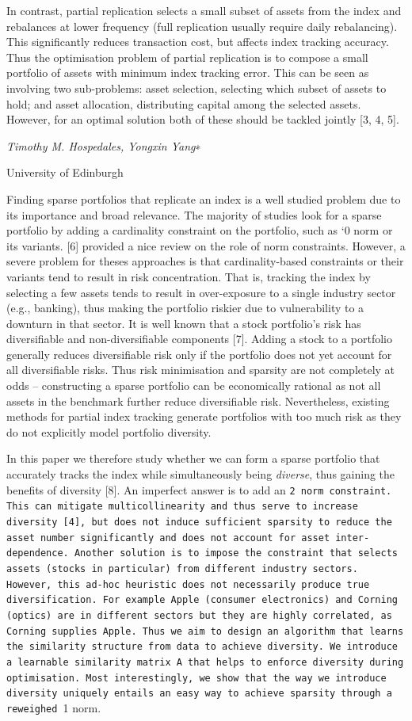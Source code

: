 \documentclass{article}
\begin{document}
In contrast, partial replication selects a small subset of assets from the index and rebalances at lower frequency (full replication usually require daily rebalancing). This significantly reduces transaction cost, but affects index tracking accuracy. Thus the optimisation problem of partial replication is to compose a small portfolio of assets with minimum index tracking error. This can be seen as involving two sub-problems: asset selection, selecting which subset of assets to hold; and asset allocation, distributing capital among the selected assets. However, for an optimal solution both of these should be tackled jointly [3, 4, 5].

\textit{Timothy M. Hospedales, Yongxin Yang}∗

University of Edinburgh

Finding sparse portfolios that replicate an index is a well studied problem due to its importance and broad relevance. The majority of studies look for a sparse portfolio by adding a cardinality constraint on the portfolio, such as `0 norm or its variants. [6] provided a nice review on the role of norm constraints. However, a severe problem for theses approaches is that cardinality-based constraints or their variants tend to result in risk concentration. That is, tracking the index by selecting a few assets tends to result in over-exposure to a single industry sector (e.g., banking), thus making the portfolio riskier due to vulnerability to a downturn in that sector. It is well known that a stock portfolio's risk has diversifiable and non-diversifiable components [7]. Adding a stock to a portfolio generally reduces diversifiable risk only if the portfolio does not yet account for all diversifiable risks. Thus risk minimisation and sparsity are not completely at odds – constructing a sparse portfolio can be economically rational as not all assets in the benchmark further reduce diversifiable risk. Nevertheless, existing methods for partial index tracking generate portfolios with too much risk as they do not explicitly model portfolio diversity.

In this paper we therefore study whether we can form a sparse portfolio that accurately tracks the index while simultaneously being \textit{diverse}, thus gaining the benefits of diversity [8]. An imperfect answer is to add an \verb|2 norm constraint. This can mitigate multicollinearity and thus serve to increase diversity [4], but does not induce sufficient sparsity to reduce the asset number significantly and does not account for asset inter-dependence. Another solution is to impose the constraint that selects assets (stocks in particular) from different industry sectors. However, this ad-hoc heuristic does not necessarily produce true diversification. For example Apple (consumer electronics) and Corning (optics) are in different sectors but they are highly correlated, as Corning supplies Apple. Thus we aim to design an algorithm that learns the similarity structure from data to achieve diversity. We introduce a learnable similarity matrix A that helps to enforce diversity during optimisation. Most interestingly, we show that the way we introduce diversity uniquely entails an easy way to achieve sparsity through a reweighed |1 norm.
\end{document}
